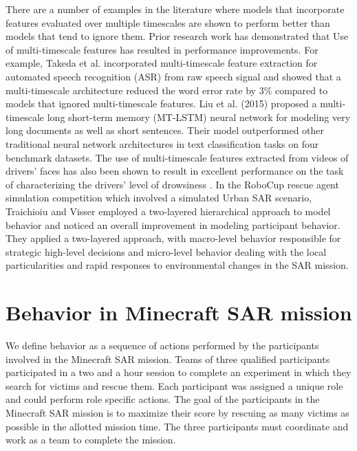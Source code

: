 \documentclass{article}
\begin{document}
There are a number of examples in the literature where models that incorporate 
features evaluated over multiple timescales are shown to perform better than 
models that tend to ignore them. 
Prior research work has demonstrated that Use of multi-timescale features has resulted
in performance improvements. For example, Takeda et al. 
\citet{takeda_multi-timescale_2018} incorporated
multi-timescale feature extraction for automated speech recognition (ASR) from 
raw speech signal and showed that a multi-timescale architecture reduced the 
word error rate by 3\% compared to models that ignored multi-timescale features. 
Liu et al. (2015) proposed a multi-timescale long short-term memory (MT-LSTM) 
neural network for modeling very long documents as well as short sentences. 
Their model outperformed other traditional neural network architectures 
in text classification tasks on four benchmark datasets. The use of multi-timescale
features extracted from videos of drivers’ faces has also been shown to result in
excellent performance on the task of characterizing the drivers’ level of 
drowsiness \citep{massoz_multi-timescale_2018}.
In the RoboCup rescue agent simulation competition
\citep{queralta_collaborative_2020} which involved a simulated
Urban SAR scenario, Traichioiu and Visser \citet{tra_hierarchical_nodate}
employed a two-layered hierarchical
approach to model behavior and noticed an overall improvement in modeling 
participant behavior. They applied a two-layered approach, with macro-level behavior
responsible for strategic high-level decisions and micro-level behavior dealing with
the local particularities and rapid responses to environmental changes in the SAR
mission.

\section*{Behavior in Minecraft SAR mission}
We define behavior as a sequence of actions performed by the participants 
involved in the Minecraft SAR mission. Teams of three qualified participants
participated in a two and a hour session to complete an experiment in which 
they search for victims and rescue them. Each participant was assigned a unique role
and could perform role specific actions. The goal of the participants in the Minecraft
SAR mission is to maximize their score by rescuing as many victims as possible in the
allotted mission time. The three participants must coordinate and work as a team to
complete the mission.
\end{document}
